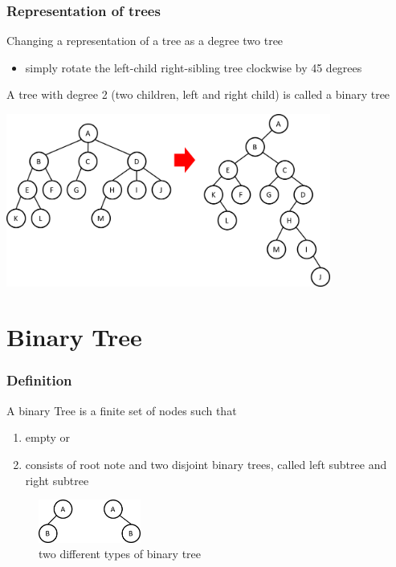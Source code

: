 \documentclass[newPxFont,sthlmFooter,nooffset]{beamer}
\begin{document}
\begin{frame}[t]
  \frametitle{Representation of trees}
Changing a representation of a tree as a degree two tree
\begin{itemize}
\item simply rotate the left-child right-sibling tree clockwise by 45 degrees
\end{itemize}

A tree with degree 2 (two children, left and right child) is called a binary tree

  \begin{center}
    \includegraphics[width=0.8\textwidth]{figures/fig04_bin.png}
  \end{center}

\end{frame}

\section{Binary Tree}


\begin{frame}[t]
  \frametitle{Definition}
A binary Tree is a finite set of nodes such that
\begin{enumerate}
\item empty or
\item consists of root note and two disjoint binary trees, called left subtree and right subtree
\end{enumerate}


\begin{figure}
  \centering
  \includegraphics[width=0.3\textwidth]{figures/fig05_binary_def.png}
\caption{two different types of binary tree}
\end{figure}
\end{frame}
\end{document}
